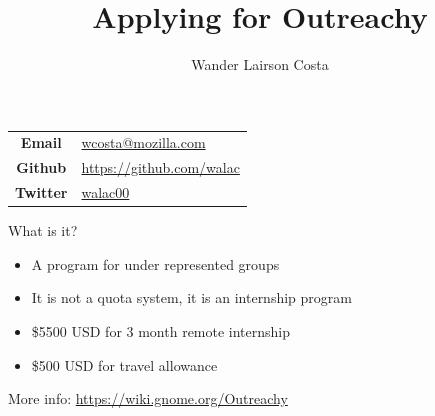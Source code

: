 \documentclass[pdf]{beamer}
\title[Outreachy]{Applying for Outreachy}
\author{{\Large Wander Lairson Costa}}
\institute{{\large Mozilla Corporation}}
\date{}
\begin{document}
\begin{frame}
  \titlepage
  \begin{center}
    \begin{tabular}{c l}
      \textbf{Email} & \href{mailto:wcosta@mozilla.com}{wcosta@mozilla.com} \\
      \textbf{Github} & \url{https://github.com/walac} \\
      \textbf{Twitter} & \href{https://twitter.com/walac00}{walac00} \\
    \end{tabular}
  \end{center}
\end{frame}

\begin{frame}{What is it?}
  \begin{itemize}
    \item A program for under represented groups
    \item It is not a quota system, it is an internship program
    \item \$5500 USD for 3 month remote internship
    \item \$500 USD for travel allowance
  \end{itemize}

  More info: \url{https://wiki.gnome.org/Outreachy}
\end{frame}
\end{document}
